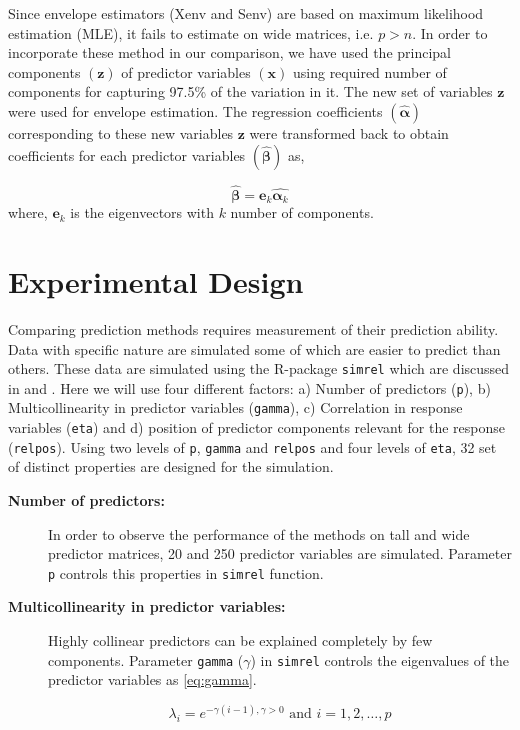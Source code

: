 \documentclass[12pt,3p,authoryear]{elsarticle}
\theoremstyle{definition}
\theoremstyle{definition}
\theoremstyle{definition}
\theoremstyle{remark}
\begin{document}
Since envelope estimators (Xenv and Senv) are based on maximum
likelihood estimation (MLE), it fails to estimate on wide matrices, i.e.
\(p > n\). In order to incorporate these method in our comparison, we
have used the principal components \((\mathbf{z})\) of predictor
variables \((\mathbf{x})\) using required number of components for
capturing 97.5\% of the variation in it. The new set of variables
\(\mathbf{z}\) were used for envelope estimation. The regression
coefficients \((\hat{\boldsymbol{\alpha}})\) corresponding to these new
variables \(\mathbf{z}\) were transformed back to obtain coefficients
for each predictor variables \((\boldsymbol{\hat{\beta}})\) as,

\[\hat{\boldsymbol{\beta}} = \mathbf{e}_k\hat{\boldsymbol{\alpha}_k}\]
where, \(\mathbf{e}_k\) is the eigenvectors with \(k\) number of
components.

\hypertarget{experimental-design}{\section{Experimental
Design}\label{experimental-design}}

Comparing prediction methods requires measurement of their prediction
ability. Data with specific nature are simulated some of which are
easier to predict than others. These data are simulated using the
R-package \texttt{simrel} which are discussed in \citet{saebo2015simrel}
and \citet{Rimal2018}. Here we will use four different factors: a)
Number of predictors (\texttt{p}), b) Multicollinearity in predictor
variables (\texttt{gamma}), c) Correlation in response variables
(\texttt{eta}) and d) position of predictor components relevant for the
response (\texttt{relpos}). Using two levels of \texttt{p},
\texttt{gamma} and \texttt{relpos} and four levels of \texttt{eta}, 32
set of distinct properties are designed for the simulation.

\begin{description}
\item[\textbf{Number of predictors:}]
In order to observe the performance of the methods on tall and wide
predictor matrices, 20 and 250 predictor variables are simulated.
Parameter \texttt{p} controls this properties in \texttt{simrel}
function.
\item[\textbf{Multicollinearity in predictor variables:}]
Highly collinear predictors can be explained completely by few
components. Parameter \texttt{gamma} (\(\gamma\)) in \texttt{simrel}
controls the eigenvalues of the predictor variables as \eqref{eq:gamma}.

\begin{equation}
  \lambda_i = e^{-\gamma(i - 1), \gamma > 0} \text{ and } i = 1, 2, \ldots, p
  \label{eq:gamma}
  \end{equation}
\end{description}
\end{document}
